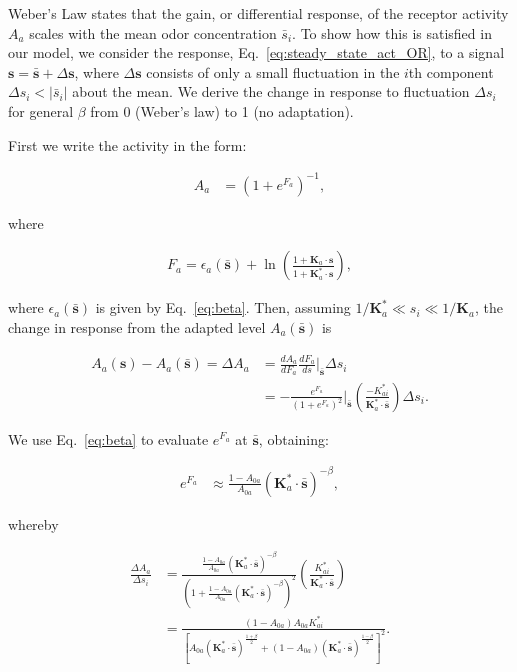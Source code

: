 \documentclass[9pt,lineno]{elife}
\begin{document}
{\color{blue}
Weber's Law states that the gain, or differential response, of the receptor activity $A_a$ scales with the mean odor concentration $\bar s_i$. To show how this is satisfied in our model, we consider the response, Eq.~\ref{eq:steady_state_act_OR}, to a signal $\mathbf{s} = \bar {\mathbf{s}} + \Delta \mathbf{s}$, where $\Delta \mathbf s$ consists of only a small fluctuation in the $i$th component $\Delta s_i < |\bar s_i|$ about the mean. We derive the change in response to fluctuation $\Delta s_i$ for general $\beta$ from 0 (Weber's law) to 1 (no adaptation).

First we write the activity in the form:

\begin{align}
A_a &= (1 + e^{F_a})^{-1},
\end{align}

where

\begin{align}
F_a = \epsilon_a(\bar {\mathbf s}) + 
\ln\left(\frac
{1 + \mathbf{K}_a\cdot {\mathbf{s}}} 
{1 + \mathbf{K}^*_a\cdot {\mathbf{s}}} 
\right),
\end{align}

where $\epsilon_a(\bar {\mathbf s})$ is given by Eq.~\ref{eq:beta}.
Then, assuming $1/\mathbf{K}^*_a \ll s_i \ll 1/\mathbf{K}_a$, the change in response from the adapted level $A_a(\bar {\mathbf s})$ is

\begin{align}
A_a(\mathbf s) - A_a(\bar {\mathbf s}) = {\Delta A_a}%
&= \frac{dA_a}{dF_a}\frac{dF_a}{ds}\bigg|_{\bar {\mathbf s}}\Delta s_i \nonumber \\
&= -\frac{e^{F_a}}{(1 + e^{F_a})^2}\bigg|_{\bar {\mathbf s}}
\left(\frac{-K^*_{ai}}{\mathbf{K}^*_a\cdot \bar {\mathbf{s}}}\right) \Delta s_i.
\end{align}

We use Eq.~\ref{eq:beta} to evaluate $e^{F_a}$ at $\bar {\mathbf s}$, obtaining:

\begin{align}
e^{F_a} &\approx \frac{1 - A_{0a}}{A_{0a}}
(\mathbf{K}^*_a\cdot \bar {\mathbf{s}})^{-\beta},
\end{align}

whereby

\begin{align}
\frac{\Delta A_a}
{\Delta s_i}%
&= 
\frac{
	\frac{1 - A_{0a}}{A_{0a}}
	(\mathbf{K}^*_a\cdot \bar {\mathbf{s}})^{-\beta}
}
{(1 + \frac{1 - A_{0a}}{A_{0a}}
	(\mathbf{K}^*_a\cdot \bar {\mathbf{s}})^{-\beta})^2
}
\left(\frac{K^*_{ai}}{\mathbf{K}^*_a\cdot \bar {\mathbf{s}}}\right)\nonumber \\
&=\frac{(1 - A_{0a})A_{0a}K^*_{ai}}
{
	[
	A_{0a}(\mathbf{K}^*_a\cdot 
	\bar {\mathbf{s}})^{\frac{1+\beta}{2}}
	+
	(1 - A_{0a})(\mathbf{K}^*_a\cdot 
	\bar {\mathbf{s}})^{\frac{1-\beta}{2}}
	]^2
}.
\label{eq:full_gain_eq}
\end{align}


}
\end{document}
